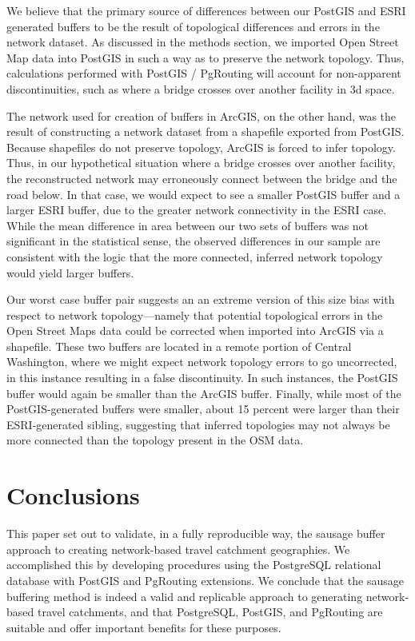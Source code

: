\documentclass[11pt,letterpaper]{article} %
\begin{document}
We believe that the primary source of differences between our PostGIS
and ESRI generated buffers to be the result of topological differences
and errors in the network dataset.  As discussed in the methods
section, we imported Open Street Map data into PostGIS in such a way
as to preserve the network topology. Thus, calculations performed with
PostGIS / PgRouting will account for non-apparent discontinuities,
such as where a bridge crosses over another facility in 3d space.

The network used for creation of buffers in ArcGIS, on the other hand,
was the result of constructing a network dataset from a shapefile
exported from PostGIS. Because shapefiles do not preserve topology,
ArcGIS is forced to infer topology. Thus, in our hypothetical
situation where a bridge crosses over another facility, the
reconstructed network may erroneously connect between the bridge and
the road below. In that case, we would expect to see a smaller PostGIS
buffer and a larger ESRI buffer, due to the greater network
connectivity in the ESRI case. While the mean difference in area
between our two sets of buffers was not significant in the statistical
sense, the observed differences in our sample are consistent with the
logic that the more connected, inferred network topology would yield
larger buffers.

Our worst case buffer pair suggests an an extreme version of this size
bias with respect to network topology---namely that potential
topological errors in the Open Street Maps data could be corrected
when imported into ArcGIS via a shapefile. These two buffers are
located in a remote portion of Central Washington, where we might
expect network topology errors to go uncorrected, in this instance
resulting in a false discontinuity. In such instances, the PostGIS
buffer would again be smaller than the ArcGIS buffer. Finally, while
most of the PostGIS-generated buffers were smaller, about 15 percent
were larger than their ESRI-generated sibling, suggesting that
inferred topologies may not always be more connected than the topology
present in the OSM data.

\section*{Conclusions}
This paper set out to validate, in a fully reproducible way, the
sausage buffer approach to creating network-based travel catchment
geographies. We accomplished this by developing procedures using the
PostgreSQL relational database with PostGIS and PgRouting
extensions. We conclude that the sausage buffering method is indeed a
valid and replicable approach to generating network-based travel
catchments, and that PostgreSQL, PostGIS, and PgRouting are 
suitable and offer important benefits for these purposes.
\end{document}
